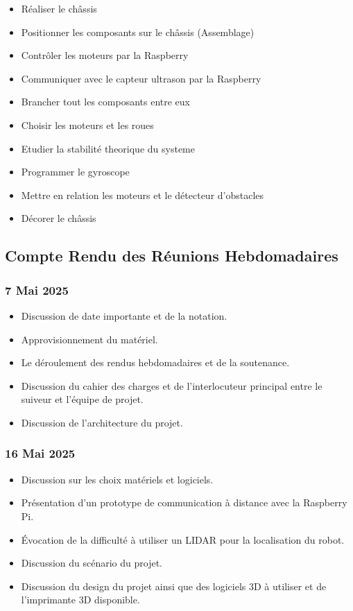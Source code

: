 \documentclass[a4paper,12pt]{report}  %
\begin{document}
\begin{itemize}
	\item Réaliser le châssis
	\item Positionner les composants sur le châssis (Assemblage)
	\item Contrôler les moteurs par la Raspberry
	\item Communiquer avec le capteur ultrason par la Raspberry
	\item Brancher tout les composants entre eux
	\item Choisir les moteurs et les roues
	\item Etudier la stabilité theorique du systeme 
	\item Programmer le gyroscope
	\item Mettre en relation les moteurs et le détecteur d'obstacles
	\item Décorer le châssis
\end{itemize}

\subsection{Compte Rendu des Réunions Hebdomadaires}

\subsubsection{7 Mai 2025}
\begin{itemize}%
	\item Discussion de date importante et de la notation.
	\item Approvisionnement du matériel.
	\item Le déroulement des rendus hebdomadaires et de la soutenance.
	\item Discussion du cahier des charges et de l'interlocuteur principal entre le suiveur et l’équipe de projet.
	\item Discussion de l’architecture du projet.
\end{itemize}

\subsubsection{16 Mai 2025}
\begin{itemize}%
	\item Discussion sur les choix matériels et logiciels.
	\item Présentation d'un prototype de communication à distance avec la Raspberry Pi.
	\item Évocation de la difficulté à utiliser un LIDAR pour la localisation du robot.
	\item Discussion du scénario du projet.
	\item Discussion du design du projet ainsi que des logiciels 3D à utiliser et de l'imprimante 3D disponible.
\end{itemize}
\end{document}

